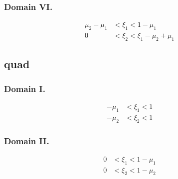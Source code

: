 \documentclass{article}
\begin{document}
\subsubsection{Domain VI.}
%
%
\begin{align}
\mu_2-\mu_1 &< \xi_1 < 1-\mu_1 \nonumber \\
0 &< \xi_2 < \xi_1 - \mu_2+\mu_1\nonumber
\end{align}



\subsection{quad}

\newcommand{\commonquad}{
\path [draw=gray] (1,-1) -- (1,1) -- (-1,1) -- (-1,-1) -- cycle;
\path [draw=gray] (-1,0) -- (1,0);
\path [draw=gray] (0,-1) -- (0,1);
\path [draw, ->] (-1.2,0) -- (1.2,0) node [anchor = west] {$\xi_1$};
\path [draw, ->] (0,-1.2) -- (0,1.2) node [anchor = south] {$\xi_2$};
\path [fill=red, opacity=.5] (0-\m,0-\p) -- (1-\m,0-\p) -- (1-\m,1-\p) -- (0-\m,1-\p) -- cycle;
\path [fill = blue, opacity=.5] (0,0) -- (1,0) -- (1,1) -- (0,1) -- cycle;
\path [draw, fill] (\m,\p) circle(.03) -- (-\m,-\p) circle(.03);
}



\subsubsection{Domain I.}
%
%
\begin{align}
-\mu_1 &< \xi_1 < 1 \nonumber \\
-\mu_2 &< \xi_2 < 1 \nonumber
\end{align}



\subsubsection{Domain II.}
%
%
\begin{align}
0 &< \xi_1 < 1 - \mu_1 \nonumber \\
0 &< \xi_2 < 1 - \mu_2 \nonumber
\end{align}
\end{document}
